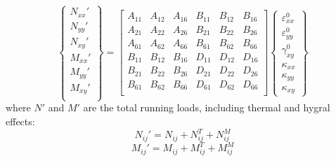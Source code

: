 \documentclass{article}
\begin{document}
\begin{equation}
    \left\{\begin{array}{c} N_{xx}'\\
                           N_{yy}'\\
                           N_{xy}'\\
                           \hline
                           M_{xx}'\\
                           M_{yy}'\\
                           M_{xy}'\\
    \end{array} \right\} =
    \left[ \begin{array}{ccc|ccc} A_{11} & A_{12} & A_{16} & B_{11} & B_{12} & B_{16} \\
                                A_{21} & A_{22} & A_{26} & B_{21} & B_{22} & B_{26} \\
                                A_{61} & A_{62} & A_{66} & B_{61} & B_{62} & B_{66} \\
                                \hline
                                B_{11} & B_{12} & B_{16} & D_{11} & D_{12} & D_{16} \\
                                B_{21} & B_{22} & B_{26} & D_{21} & D_{22} & D_{26} \\
                                B_{61} & B_{62} & B_{66} & D_{61} & D_{62} & D_{66} \\
            \end{array} \right]
    \left\{ \begin{array}{c} \varepsilon_{xx}^{0} \\ \varepsilon_{yy}^{0} \\ \gamma_{xy}^{0} \\ \hline \kappa_{xx} \\ \kappa_{yy} \\ \kappa_{xy} \end{array}\right\}
\end{equation}
where $N'$ and $M'$ are the total running loads, including thermal and hygral effects:
\begin{equation}
    N_{ij}' = N_{ij} + N_{ij}^T + N_{ij}^M
\end{equation}
\begin{equation}
    M_{ij}' = M_{ij} + M_{ij}^T + M_{ij}^M
\end{equation}
\end{document}
